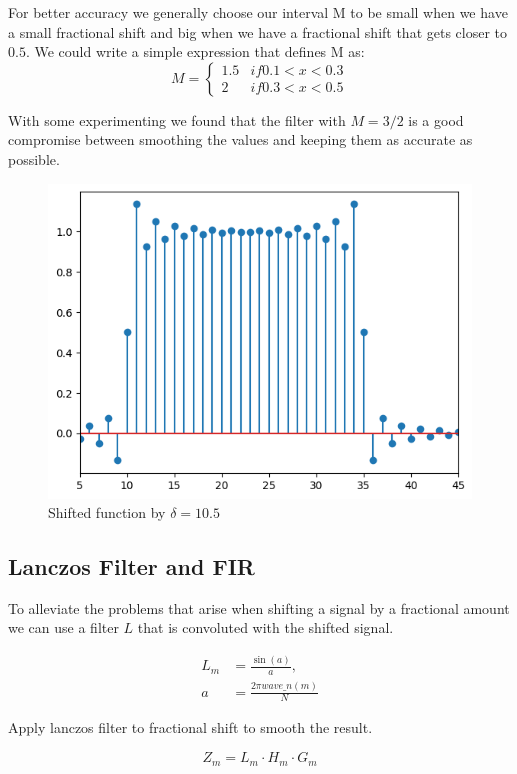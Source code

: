 \documentclass[]{usiinfbachelorproject}
\begin{document}
	
	For better accuracy we generally choose our interval M to be small when we have a small fractional shift and big when we have a fractional shift that gets closer to $0.5$. We could write a simple expression that defines M as:
	\begin{equation*}
		M = 
		\begin{cases}
			1.5 & if 0.1 < x < 0.3\\
			2 & if 0.3 < x < 0.5
		\end{cases}
	\end{equation*}
	
	With some experimenting we found that the filter with $M=3/2$ is a good compromise between smoothing the values and keeping them as accurate as possible.
	
	
	\iffalse

	
	\begin{figure}[h]
		\centering
		\includegraphics[width=0.5\columnwidth]{images/box_shifted_delta10_1_n50.png}
		\caption{Shifted function by $\delta=10.5$}
	\end{figure}
	
	\subsection{Lanczos Filter and FIR}
	To alleviate the problems that arise when shifting a signal by a fractional amount we can use a filter $L$ that is convoluted with the shifted signal.
	
	\begin{align*}
		L_m &= \frac{\sin(a)}{a},\\
		a &= \frac{2\pi wave\_n(m)}{N}
	\end{align*}
	
	Apply lanczos filter to fractional shift to smooth the result.
	
	\begin{equation*}
		Z_m = L_m \cdot H_m \cdot G_m
	\end{equation*}
	
\end{document}
